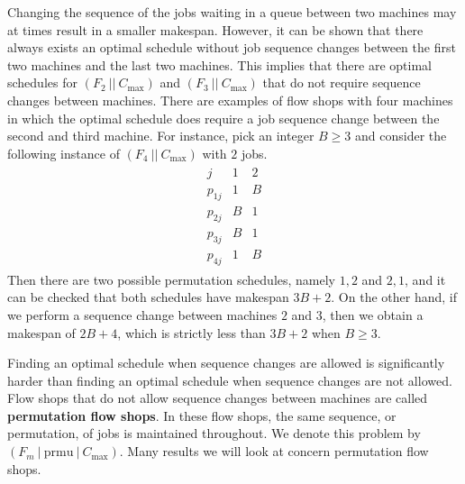 Changing the sequence of the 
jobs waiting in a queue between two machines may at times result in a smaller 
makespan. However, it can be shown that there always exists an optimal 
schedule without job sequence changes between the first two machines 
and the last two machines. This implies that there are optimal schedules for 
$(F_2~||~C_{\max})$ and $(F_3~||~C_{\max})$ that do not require 
sequence changes between machines. There are examples of flow shops with 
four machines in which the optimal schedule does require a job sequence 
change between the second and third machine. For instance, pick an 
integer $B \geq 3$ and consider the following instance of $(F_4~||~C_{\max})$
with $2$ jobs. 
\begin{align*}
    \begin{array}{c|cc}
        j & 1 & 2 \\ \hline 
        p_{1j} & 1 & B \\ 
        p_{2j} & B & 1 \\ 
        p_{3j} & B & 1 \\ 
        p_{4j} & 1 & B
    \end{array}
\end{align*}
Then there are two possible permutation schedules, namely $1, 2$ and $2, 1$, 
and it can be checked that both schedules have makespan $3B + 2$. 
On the other hand, if we perform a sequence change between machines $2$ and 
$3$, then we obtain a makespan of $2B + 4$, which is strictly less than 
$3B + 2$ when $B \geq 3$. 

Finding an optimal schedule when sequence changes are allowed is significantly
harder than finding an optimal schedule when sequence changes are not
allowed. Flow shops that do not allow sequence changes between machines are
called {\bf permutation flow shops}. In these flow shops, the same sequence, 
or permutation, of jobs is maintained throughout. We denote this 
problem by $(F_m~|~\text{prmu}~|~C_{\max})$. Many results we will
look at concern permutation flow shops. 

